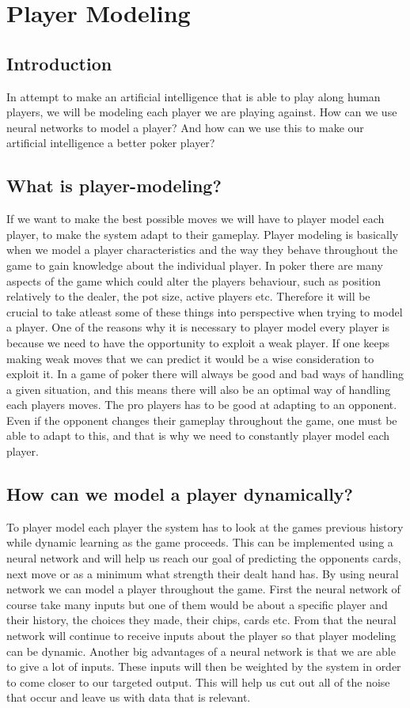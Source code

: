 \section{Player Modeling}

\subsection{Introduction}
In attempt to make an artificial intelligence that is able to play along human players, we will be modeling each player we are playing against. How can we use neural networks to model a player? And how can we use this to make our artificial intelligence a better poker player?

\subsection{What is player-modeling?}
If we want to make the best possible moves we will have to player model each player, to make the system adapt to their gameplay.
Player modeling is basically when we model a player characteristics and the way they behave throughout the game to gain knowledge about the individual player. 
In poker there are many aspects of the game which could alter the players behaviour, such as position relatively to the dealer, the pot size, active players etc. Therefore it will be crucial to take atleast some of these things into perspective when trying to model a player. One of the reasons why it is necessary to player model every player is because we need to have the opportunity to exploit a weak player. If one keeps making weak moves that we can predict it would be a wise consideration to exploit it.
In a game of poker there will always be good and bad ways of handling a given situation, and this means there will also be an optimal way of handling each players moves. 
The pro players has to be good at adapting to an opponent. Even if the opponent changes their gameplay throughout the game, one must be able to adapt to this, and that is why we need to constantly player model each player.

\subsection{How can we model a player dynamically?}
To player model each player the system has to look at the games previous history while dynamic learning as the game proceeds.
This can be implemented using a neural network and will help us reach our goal of predicting the opponents cards, next move or as a minimum what strength their dealt hand has. By using neural network we can model a player throughout the game. First the neural network of course take many inputs but one of them would be about a specific player and their history, the choices they made, their chips, cards etc. From that the neural network will continue to receive inputs about the player so that player modeling can be dynamic.
Another big advantages of a neural network is that we are able to give a lot of inputs. These inputs will then be weighted by the system in order to come closer to our targeted output.
This will help us cut out all of the noise that occur and leave us with data that is relevant.


